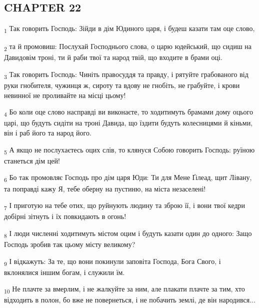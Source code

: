 \subsection{CHAPTER 22}
\begin{tcolorbox}
\textsubscript{1} Так говорить Господь: Зійди в дім Юдиного царя, і будеш казати там оце слово,
\end{tcolorbox}
\begin{tcolorbox}
\textsubscript{2} та й промовиш: Послухай Господнього слова, о царю юдейський, що сидиш на Давидовім троні, ти й раби твої та народ твій, що входите в брами оці.
\end{tcolorbox}
\begin{tcolorbox}
\textsubscript{3} Так говорить Господь: Чиніть правосуддя та правду, і рятуйте грабованого від руки гнобителя, чужинця ж, сироту та вдову не гнобіть, не грабуйте, і крови невинної не проливайте на місці цьому!
\end{tcolorbox}
\begin{tcolorbox}
\textsubscript{4} Бо коли оце слово насправді ви виконаєте, то ходитимуть брамами дому оцього царі, що будуть сидіти на троні Давида, що їздити будуть колесницями й кіньми, він і раб його та народ його.
\end{tcolorbox}
\begin{tcolorbox}
\textsubscript{5} А якщо не послухаєтесь оцих слів, то клянуся Собою говорить Господь: руїною станеться дім цей!
\end{tcolorbox}
\begin{tcolorbox}
\textsubscript{6} Бо так промовляє Господь про дім царя Юди: Ти для Мене Ґілеад, щит Лівану, та поправді кажу Я, тебе оберну на пустиню, на міста незаселені!
\end{tcolorbox}
\begin{tcolorbox}
\textsubscript{7} І приготую на тебе отих, що руйнують людину та зброю її, і вони твої кедри добірні зітнуть і їх повкидають в огонь!
\end{tcolorbox}
\begin{tcolorbox}
\textsubscript{8} І люди численні ходитимуть містом оцим і будуть казати один до одного: Защо Господь зробив так цьому місту великому?
\end{tcolorbox}
\begin{tcolorbox}
\textsubscript{9} І відкажуть: За те, що вони покинули заповіта Господа, Бога Свого, і вклонялися іншим богам, і служили їм.
\end{tcolorbox}
\begin{tcolorbox}
\textsubscript{10} Не плачте за вмерлим, і не жалкуйте за ним, але плакати плачте за тим, хто відходить в полон, бо вже не повернеться, і не побачить землі, де він народився...
\end{tcolorbox}
